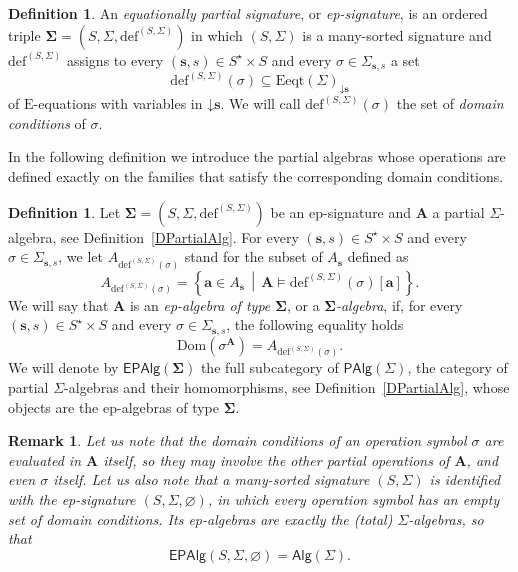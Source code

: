 \documentclass[a4paper, reqno
]{amsart}
\newcommand{\vs}[1]{\mathbin{\downarrow}#1}
\newcommand{\sig}[1]{\mathbf{#1}}             %
\newcommand{\Dom}{\mathrm{Dom}}
\theoremstyle{plain}
\newtheorem{remark}[theorem]{Remark}
\theoremstyle{definition}
\newtheorem{definition}[theorem]{Definition}
\begin{document}
\begin{definition}\label{DEpSignature}
An \emph{equationally partial signature}, or \emph{ep-signature}, is an ordered triple $\sig{\Sigma}=(S,\Sigma,\mathrm{def}^{(S,\Sigma)})$ in which $(S,\Sigma)$ is a many-sorted signature and $\mathrm{def}^{(S,\Sigma)}$ assigns to every $(\mathbf{s},s)\in S^{\star}\times S$ and every $\sigma\in\Sigma_{\mathbf{s},s}$ a set
$$
\mathrm{def}^{(S,\Sigma)}(\sigma)\subseteq\mathrm{Eeqt}(\Sigma)_{\vs{\mathbf{s}}}
$$
of $\mathrm{E}$-equations with variables in $\vs{\mathbf{s}}$.
We will call $\mathrm{def}^{(S,\Sigma)}(\sigma)$ the set of \emph{domain conditions} of $\sigma$.
\end{definition}

In the following definition we introduce the partial algebras whose operations are defined exactly on the families that satisfy the corresponding domain conditions.

\begin{definition}\label{DEpAlgebra}
Let $\sig{\Sigma}=(S,\Sigma,\mathrm{def}^{(S,\Sigma)})$ be an ep-signature and $\mathbf{A}$ a partial $\Sigma$-algebra, see Definition~\ref{DPartialAlg}.
For every $(\mathbf{s},s)\in S^{\star}\times S$ and every $\sigma\in\Sigma_{\mathbf{s},s}$, we let $A_{\mathrm{def}^{(S,\Sigma)}(\sigma)}$ stand for the subset of $A_{\mathbf{s}}$ defined as
$$
A_{\mathrm{def}^{(S,\Sigma)}(\sigma)}=\left\lbrace\mathbf{a}\in A_{\mathbf{s}}\,\middle|\,\mathbf{A}\models\mathrm{def}^{(S,\Sigma)}(\sigma)[\mathbf{a}]\right\rbrace.
$$
We will say that $\mathbf{A}$ is an \emph{ep-algebra of type $\sig{\Sigma}$}, or a \emph{$\sig{\Sigma}$-algebra}, if, for every $(\mathbf{s},s)\in S^{\star}\times S$ and every $\sigma\in\Sigma_{\mathbf{s},s}$, the following equality holds
$$
\Dom\left(\sigma^{\mathbf{A}}\right)=A_{\mathrm{def}^{(S,\Sigma)}(\sigma)}.
$$
We will denote by $\mathsf{EPAlg}(\sig{\Sigma})$ the full subcategory of $\mathsf{PAlg}(\Sigma)$, the category of partial $\Sigma$-algebras and their homomorphisms, see Definition~\ref{DPartialAlg}, whose objects are the ep-algebras of type $\sig{\Sigma}$.
\end{definition}

\begin{remark}\label{REpAlgebra}
Let us note that the domain conditions of an operation symbol $\sigma$ are evaluated in $\mathbf{A}$ itself, so they may involve the other partial operations of $\mathbf{A}$, and even $\sigma$ itself.
Let us also note that a many-sorted signature $(S,\Sigma)$ is identified with the ep-signature $(S,\Sigma,\varnothing)$, in which every operation symbol has an empty set of domain conditions.
Its ep-algebras are exactly the (total) $\Sigma$-algebras, so that
$$
\mathsf{EPAlg}(S,\Sigma,\varnothing)=\mathsf{Alg}(\Sigma).
$$
\end{remark}
\end{document}
